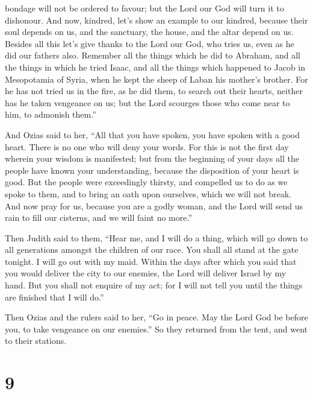 bondage will not be ordered to favour; but the Lord our God will turn it
to dishonour.  And now, kindred, let's show an example to
our kindred, because their soul depends on us, and the sanctuary, the
house, and the altar depend on us.  Besides all this let's
give thanks to the Lord our God, who tries us, even as he did our
fathers also.  Remember all the things which he did to
Abraham, and all the things in which he tried Isaac, and all the things
which happened to Jacob in Mesopotamia of Syria, when he kept the sheep
of Laban his mother's brother.  For he has not tried us in
the fire, as he did them, to search out their hearts, neither has he
taken vengeance on us; but the Lord scourges those who come near to him,
to admonish them.''

 And Ozias said to her, ``All that you have spoken, you
have spoken with a good heart. There is no one who will deny your words.
 For this is not the first day wherein your wisdom is
manifested; but from the beginning of your days all the people have
known your understanding, because the disposition of your heart is good.
 But the people were exceedingly thirsty, and compelled us
to do as we spoke to them, and to bring an oath upon ourselves, which we
will not break.  And now pray for us, because you are a
godly woman, and the Lord will send us rain to fill our cisterns, and we
will faint no more.''

 Then Judith said to them, ``Hear me, and I will do a
thing, which will go down to all generations amongst the children of our
race.  You shall all stand at the gate tonight. I will go
out with my maid. Within the days after which you said that you would
deliver the city to our enemies, the Lord will deliver Israel by my
hand.  But you shall not enquire of my act; for I will not
tell you until the things are finished that I will do.''

 Then Ozias and the rulers said to her, ``Go in peace. May
the Lord God be before you, to take vengeance on our enemies.''
 So they returned from the tent, and went to their
stations.

\hypertarget{section-8}{%
\section{9}\label{section-8}}

